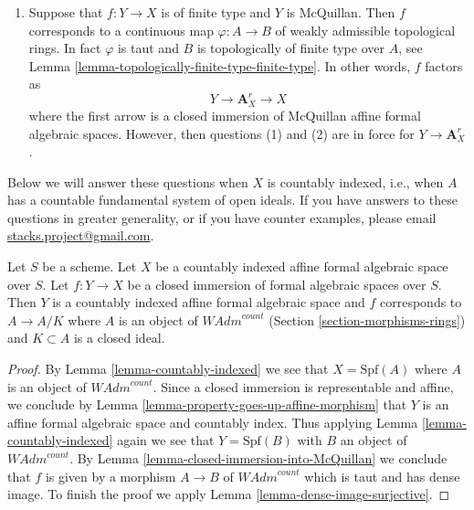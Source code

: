 \begin{remark}
\begin{enumerate}
\item Suppose that $f : Y \to X$ is of finite type and $Y$ is McQuillan.
Then $f$ corresponds to a continuous map $\varphi : A \to B$ of weakly
admissible topological rings. In fact $\varphi$ is taut and
$B$ is topologically of finite type over $A$, see
Lemma \ref{lemma-topologically-finite-type-finite-type}.
In other words, $f$ factors as
$$
Y \longrightarrow \mathbf{A}^r_X \longrightarrow X
$$
where the first arrow is a closed immersion of McQuillan affine
formal algebraic spaces. However, then questions (1) and
(2) are in force for $Y \to \mathbf{A}^r_X$.
\end{enumerate}
Below we will answer these questions when
$X$ is countably indexed, i.e., when $A$ has a countable fundamental
system of open ideals. If you have answers to these questions
in greater generality, or if you have counter examples, please email
\href{mailto:stacks.project@gmail.com}{stacks.project@gmail.com}.
\end{remark}

\begin{lemma}
\label{lemma-closed-immersion-into-countably-indexed}
Let $S$ be a scheme. Let $X$ be a countably indexed affine formal algebraic
space over $S$. Let $f : Y \to X$ be a closed immersion of formal algebraic
spaces over $S$. Then $Y$ is a countably indexed affine formal algebraic space
and $f$ corresponds to $A \to A/K$ where $A$ is an object of
$\textit{WAdm}^{count}$
(Section \ref{section-morphisms-rings})
and $K \subset A$ is a closed ideal.
\end{lemma}

\begin{proof}
By Lemma \ref{lemma-countably-indexed}
we see that $X = \text{Spf}(A)$ where $A$ is an object of
$\textit{WAdm}^{count}$. Since a closed immersion is representable
and affine, we conclude by Lemma \ref{lemma-property-goes-up-affine-morphism}
that $Y$ is an affine formal algebraic space and countably index.
Thus applying Lemma \ref{lemma-countably-indexed}
again we see that $Y = \text{Spf}(B)$ with $B$ an object of
$\textit{WAdm}^{count}$. By Lemma \ref{lemma-closed-immersion-into-McQuillan}
we conclude that $f$ is given by a morphism $A \to B$ of
$\textit{WAdm}^{count}$ which is taut and has dense image.
To finish the proof we apply
Lemma \ref{lemma-dense-image-surjective}.
\end{proof}

